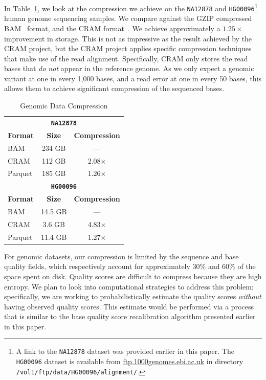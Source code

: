 \documentclass[masters]{ucbthesis}
\begin{document}
In Table~\ref{tab:genomic-compression}, we look at the compression we achieve on the \texttt{NA12878}
and \texttt{HG00096}\footnote{A link to the \texttt{NA12878} dataset was provided earlier in this paper. The
\texttt{HG00096} dataset is available from \url{ftp.1000genomes.ebi.ac.uk} in directory 
\texttt{/vol1/ftp/data/HG00096/alignment/}.} human genome sequencing samples. We compare against the
GZIP compressed BAM~\cite{li09} format, and the CRAM format~\cite{fritz11}. We achieve approximately a
$1.25\times$ improvement in storage. This is not as impressive as the result achieved by the CRAM project,
but the CRAM project applies specific compression techniques that make use of the read alignment. Specifically,
CRAM only stores the read bases that \emph{do not} appear in the reference genome. As we only expect a
genomic variant at one in every 1,000 bases, and a read error at one in every 50 bases, this allows them to
achieve significant compression of the sequenced bases.

\begin{table}[h]
\caption{Genomic Data Compression}
\label{tab:genomic-compression}
\begin{center}
\begin{tabular}{ l c c }
\hline
\multicolumn{3}{c}{\textbf{\texttt{NA12878}}} \\
\textbf{Format} & \textbf{Size} & \textbf{Compression} \\
\hline
\hline
BAM & 234 GB & --- \\
CRAM & 112 GB & 2.08$\times$ \\
Parquet & 185 GB & 1.26$\times$ \\
\hline
\multicolumn{3}{c}{\textbf{\texttt{HG00096}}} \\
\textbf{Format} & \textbf{Size} & \textbf{Compression} \\
\hline
\hline
BAM & 14.5 GB & --- \\
CRAM & 3.6 GB & 4.83$\times$ \\
Parquet & 11.4 GB & 1.27$\times$ \\
\hline
\end{tabular}
\end{center}
\end{table}

For genomic datasets, our compression is limited by the sequence and base quality fields, which respectively
account for approximately 30\% and 60\% of the space spent on disk. Quality scores are difficult to compress
because they are high entropy. We plan to look into computational strategies to address this problem;
specifically, we are working to probabilistically estimate the quality scores \emph{without} having observed quality
scores. This estimate would be performed via a process that is similar to the base quality score recalibration algorithm
presented earlier in this paper.
\end{document}
